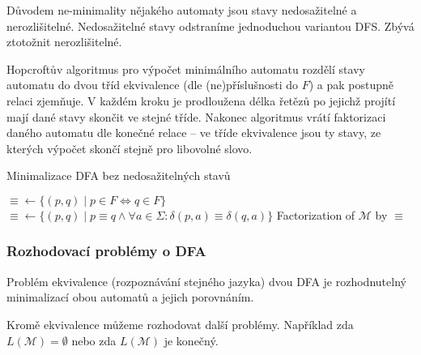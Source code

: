 Důvodem ne-minimality nějakého automaty jsou stavy nedosažitelné a nerozlišitelné.
Nedosažitelné stavy odstraníme jednoduchou variantou DFS. Zbývá
ztotožnit nerozlišitelné.



Hopcroftův algoritmus pro výpočet minimálního automatu rozdělí stavy
automatu do dvou tříd ekvivalence (dle (ne)příslušnosti do $F$) a pak
postupně relaci zjemňuje. V každém kroku je prodloužena délka řetězů po
jejichž projítí mají dané stavy skončit ve stejné tříde.  Nakonec
algoritmus vrátí faktorizaci daného automatu dle konečné relace --
ve tříde ekvivalence jsou ty stavy, ze kterých výpočet
skončí stejně pro libovolné slovo.

\begin{algorithm}
\caption{Minimalizace DFA bez nedosažitelných stavů}
\begin{algorithmic}[1]
    \State ${\equiv} \gets \{(p,q) \mid p \in F \iff q \in F \}$
        \State ${\equiv} \gets
            \{ (p,q) \mid p \equiv q \land \forall a \in \Sigma :
            \delta(p,a) \equiv \delta(q,a) \}$
    \EndWhile
    \State \Return Factorization of $\mathcal{M}$ by ${\equiv}$
\EndFunction
\end{algorithmic}
\end{algorithm}

\begin{example}
\end{example}

\subsubsection{Rozhodovací problémy o DFA}

Problém ekvivalence (rozpoznávání stejného jazyka) dvou DFA je
rozhodnutelný minimalizací obou automatů a jejich porovnáním.

Kromě ekvivalence můžeme rozhodovat další problémy. Například zda
\linebreak $L(\mathcal{M}) = \emptyset$ nebo zda $L(\mathcal{M})$ je
konečný.

